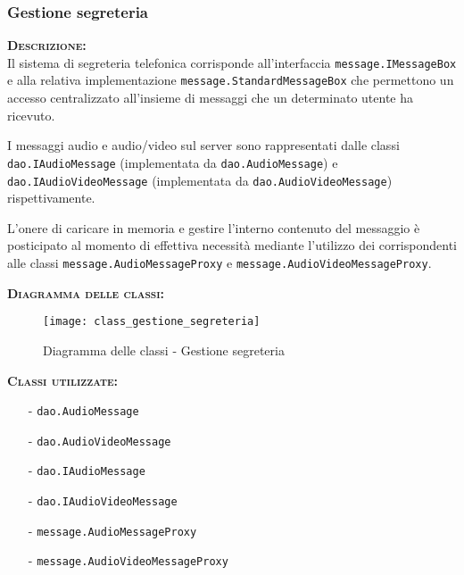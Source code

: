 \subsubsection{Gestione segreteria}
\begin{description}
	\item{\scshape\bfseries Descrizione:}\\
Il sistema di segreteria telefonica corrisponde all'interfaccia \texttt{message.IMessageBox} e alla relativa implementazione \texttt{message.StandardMessageBox} che permettono un accesso centralizzato all'insieme di messaggi che un determinato utente ha ricevuto.

I messaggi audio e audio/video sul server sono rappresentati dalle classi \texttt{dao.IAudioMessage} (implementata da \texttt{dao.AudioMessage}) e \texttt{dao.IAudioVideoMessage} (implementata da \texttt{dao.AudioVideoMessage}) rispettivamente.

L'onere di caricare in memoria e gestire l'interno contenuto del messaggio è posticipato al momento di effettiva necessità mediante l'utilizzo dei  corrispondenti alle classi \texttt{message.AudioMessageProxy} e \texttt{message.AudioVideoMessageProxy}.
	\item{\scshape\bfseries Diagramma delle classi:}
\begin{figure}[H]
\begin{center}
\texttt{[image: class\_gestione\_segreteria]}
\caption{Diagramma delle classi - Gestione segreteria}\label{fig:gestione_segreteria}
\end{center}
\end{figure}	
	
	\item{\scshape\bfseries Classi utilizzate:}
	\begin{itemize}[noitemsep,nolistsep]
	  \item[-] \texttt{dao.AudioMessage}
	  \item[-] \texttt{dao.AudioVideoMessage}
	  \item[-] \texttt{dao.IAudioMessage}
	  \item[-] \texttt{dao.IAudioVideoMessage}
	  \item[-] \texttt{message.AudioMessageProxy}
	  \item[-] \texttt{message.AudioVideoMessageProxy}
	\end{itemize}
\end{description}

